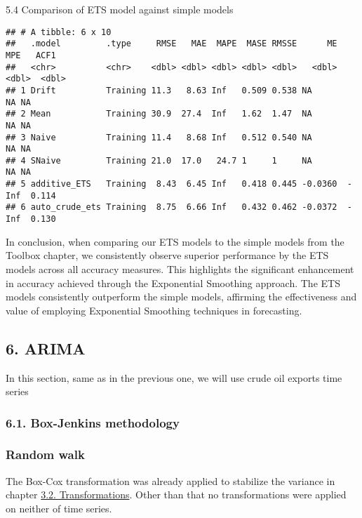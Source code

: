 \documentclass[
]{article}
\begin{document}
5.4 Comparison of ETS model against simple models

\begin{verbatim}
## # A tibble: 6 x 10
##   .model         .type     RMSE   MAE  MAPE  MASE RMSSE      ME   MPE   ACF1
##   <chr>          <chr>    <dbl> <dbl> <dbl> <dbl> <dbl>   <dbl> <dbl>  <dbl>
## 1 Drift          Training 11.3   8.63 Inf   0.509 0.538 NA         NA NA    
## 2 Mean           Training 30.9  27.4  Inf   1.62  1.47  NA         NA NA    
## 3 Naive          Training 11.4   8.68 Inf   0.512 0.540 NA         NA NA    
## 4 SNaive         Training 21.0  17.0   24.7 1     1     NA         NA NA    
## 5 additive_ETS   Training  8.43  6.45 Inf   0.418 0.445 -0.0360  -Inf  0.114
## 6 auto_crude_ets Training  8.75  6.66 Inf   0.432 0.462 -0.0372  -Inf  0.130
\end{verbatim}

In conclusion, when comparing our ETS models to the simple models from
the Toolbox chapter, we consistently observe superior performance by the
ETS models across all accuracy measures. This highlights the significant
enhancement in accuracy achieved through the Exponential Smoothing
approach. The ETS models consistently outperform the simple models,
affirming the effectiveness and value of employing Exponential Smoothing
techniques in forecasting.

\hypertarget{arima}{%
\subsection{6. ARIMA}\label{arima}}

In this section, same as in the previous one, we will use crude oil
exports time series

\hypertarget{box-jenkins-methodology}{%
\subsubsection{6.1. Box-Jenkins
methodology}\label{box-jenkins-methodology}}

\hypertarget{random-walk}{%
\subsubsection{Random walk}\label{random-walk}}

The Box-Cox transformation was already applied to stabilize the variance
in chapter \protect\hyperlink{transformations}{3.2. Transformations}.
Other than that no transformations were applied on neither of time
series.
\end{document}
